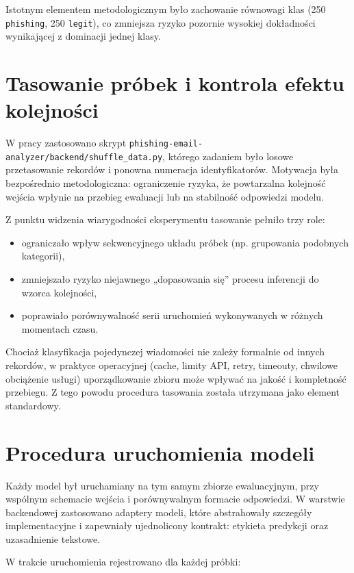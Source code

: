 \documentclass[12pt,a4paper,openright]{report}
\begin{document}
Istotnym elementem metodologicznym było zachowanie równowagi klas (250 \texttt{phishing}, 250 \texttt{legit}), co zmniejsza ryzyko pozornie wysokiej dokładności wynikającej z dominacji jednej klasy.

\section{Tasowanie próbek i kontrola efektu kolejności}

W pracy zastosowano skrypt \texttt{phishing-email-analyzer/backend/shuffle\_data.py}, którego zadaniem było losowe przetasowanie rekordów i ponowna numeracja identyfikatorów. Motywacja była bezpośrednio metodologiczna: ograniczenie ryzyka, że powtarzalna kolejność wejścia wpłynie na przebieg ewaluacji lub na stabilność odpowiedzi modelu.

Z punktu widzenia wiarygodności eksperymentu tasowanie pełniło trzy role:

\begin{itemize}
    \item ograniczało wpływ sekwencyjnego układu próbek (np. grupowania podobnych kategorii),
    \item zmniejszało ryzyko niejawnego „dopasowania się” procesu inferencji do wzorca kolejności,
    \item poprawiało porównywalność serii uruchomień wykonywanych w różnych momentach czasu.
\end{itemize}

Chociaż klasyfikacja pojedynczej wiadomości nie zależy formalnie od innych rekordów, w praktyce operacyjnej (cache, limity API, retry, timeouty, chwilowe obciążenie usługi) uporządkowanie zbioru może wpływać na jakość i kompletność przebiegu. Z tego powodu procedura tasowania została utrzymana jako element standardowy.

\section{Procedura uruchomienia modeli}

Każdy model był uruchamiany na tym samym zbiorze ewaluacyjnym, przy wspólnym schemacie wejścia i porównywalnym formacie odpowiedzi. W warstwie backendowej zastosowano adaptery modeli, które abstrahowały szczegóły implementacyjne i zapewniały ujednolicony kontrakt: etykieta predykcji oraz uzasadnienie tekstowe.

W trakcie uruchomienia rejestrowano dla każdej próbki:
\end{document}
